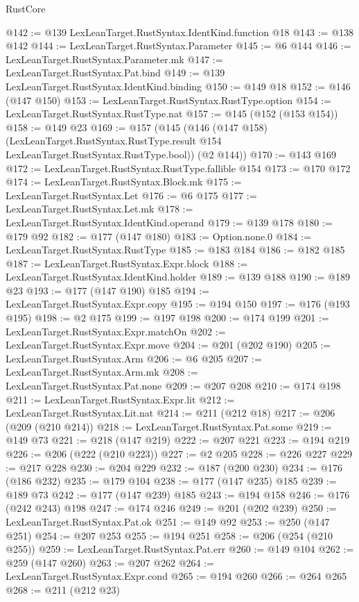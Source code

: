 \begin{lexlean}{RustCore}
\begin{coremodule}
@142 := @139 LexLeanTarget.RustSyntax.IdentKind.function @18
@143 := @138 @142
@144 := LexLeanTarget.RustSyntax.Parameter
@145 := @6 @144
@146 := LexLeanTarget.RustSyntax.Parameter.mk
@147 := LexLeanTarget.RustSyntax.Pat.bind
@149 := @139 LexLeanTarget.RustSyntax.IdentKind.binding
@150 := @149 @18
@152 := @146 (@147 @150)
@153 := LexLeanTarget.RustSyntax.RustType.option
@154 := LexLeanTarget.RustSyntax.RustType.nat
@157 := @145 (@152 (@153 @154))
@158 := @149 @23
@169 := @157
    (@145
      (@146
        (@147 @158)
        (LexLeanTarget.RustSyntax.RustType.result @154 LexLeanTarget.RustSyntax.RustType.bool))
      (@2 @144))
@170 := @143 @169
@172 := LexLeanTarget.RustSyntax.RustType.fallible @154
@173 := @170 @172
@174 := LexLeanTarget.RustSyntax.Block.mk
@175 := LexLeanTarget.RustSyntax.Let
@176 := @6 @175
@177 := LexLeanTarget.RustSyntax.Let.mk
@178 := LexLeanTarget.RustSyntax.IdentKind.operand
@179 := @139 @178
@180 := @179 @92
@182 := @177 (@147 @180)
@183 := Option.none.{0}
@184 := LexLeanTarget.RustSyntax.RustType
@185 := @183 @184
@186 := @182 @185
@187 := LexLeanTarget.RustSyntax.Expr.block
@188 := LexLeanTarget.RustSyntax.IdentKind.holder
@189 := @139 @188
@190 := @189 @23
@193 := @177 (@147 @190) @185
@194 := LexLeanTarget.RustSyntax.Expr.copy
@195 := @194 @150
@197 := @176 (@193 @195)
@198 := @2 @175
@199 := @197 @198
@200 := @174 @199
@201 := LexLeanTarget.RustSyntax.Expr.matchOn
@202 := LexLeanTarget.RustSyntax.Expr.move
@204 := @201 (@202 @190)
@205 := LexLeanTarget.RustSyntax.Arm
@206 := @6 @205
@207 := LexLeanTarget.RustSyntax.Arm.mk
@208 := LexLeanTarget.RustSyntax.Pat.none
@209 := @207 @208
@210 := @174 @198
@211 := LexLeanTarget.RustSyntax.Expr.lit
@212 := LexLeanTarget.RustSyntax.Lit.nat
@214 := @211 (@212 @18)
@217 := @206 (@209 (@210 @214))
@218 := LexLeanTarget.RustSyntax.Pat.some
@219 := @149 @73
@221 := @218 (@147 @219)
@222 := @207 @221
@223 := @194 @219
@226 := @206 (@222 (@210 @223))
@227 := @2 @205
@228 := @226 @227
@229 := @217 @228
@230 := @204 @229
@232 := @187 (@200 @230)
@234 := @176 (@186 @232)
@235 := @179 @104
@238 := @177 (@147 @235) @185
@239 := @189 @73
@242 := @177 (@147 @239) @185
@243 := @194 @158
@246 := @176 (@242 @243) @198
@247 := @174 @246
@249 := @201 (@202 @239)
@250 := LexLeanTarget.RustSyntax.Pat.ok
@251 := @149 @92
@253 := @250 (@147 @251)
@254 := @207 @253
@255 := @194 @251
@258 := @206 (@254 (@210 @255))
@259 := LexLeanTarget.RustSyntax.Pat.err
@260 := @149 @104
@262 := @259 (@147 @260)
@263 := @207 @262
@264 := LexLeanTarget.RustSyntax.Expr.cond
@265 := @194 @260
@266 := @264 @265
@268 := @211 (@212 @23)

\end{coremodule}
\end{lexlean}
